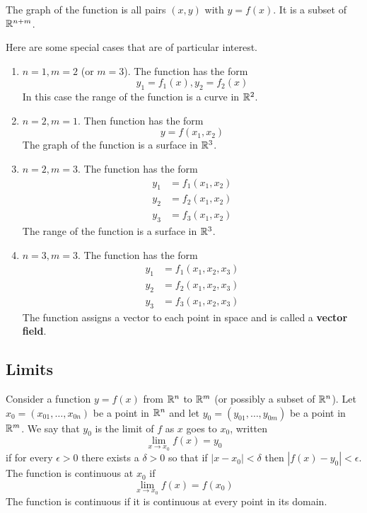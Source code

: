 The graph of the function is all pairs $(x,y)$ with $y=f(x)$. It is a subset of $\mathbb R^{n+m}$.

Here are some special cases that are of particular interest.
\begin{enumerate}
\item $n = 1, m = 2$ (or $m = 3$). The function has the form
\[ y_1 = f_1(x), y_2 = f_2(x) \]
In this case the range of the function is a curve in $\mathbb R^2$.

\item $n = 2, m = 1$. Then function has the form
\[ y = f(x_1, x_2) \]
The graph of the function is a surface in $\mathbb R^3$.

\item $n = 2, m = 3$. The function has the form
\[ \begin{split}
y_1 &= f_1(x_1, x_2) \\
y_2 &= f_2(x_1, x_2) \\
y_3 &= f_3(x_1, x_2)
\end{split} \]
The range of the function is a surface in $\mathbb R^3$.

\item $n = 3, m = 3$. The function has the form
\[ \begin{split}
y_1 &= f_1(x_1, x_2, x_3) \\
y_2 &= f_2(x_1, x_2, x_3) \\
y_3 &= f_3(x_1, x_2, x_3)
\end{split} \]
The function assigns a vector to each point in space and is called a \textbf{vector field}.
\end{enumerate}

\subsection{Limits}
Consider a function $y = f(x)$ from $\mathbb R^n$ to $\mathbb R^m$ (or possibly a subset of $\mathbb R^n$). Let $x_0 = (x_{01},\dots,x_{0n})$ be a point in $\mathbb R^n$ and let $y_0 = (y_{01},\dots,y_{0m})$ be a point in $\mathbb R^m$. We say that $y_0$ is the limit of $f$ as $x$ goes to $x_0$, written
\begin{equation}
\lim_{x\to x_0} f(x) = y_0
\end{equation}
if for every $\epsilon > 0$ there exists a $\delta > 0$ so that if $|x-x_0|<\delta$ then $|f(x)-y_0|<\epsilon$. The function is continuous at $x_0$ if
\begin{equation}
\lim_{x\to x_0} f(x) = f(x_0)
\end{equation}
The function is continuous if it is continuous at every point in its domain.
\pagebreak

